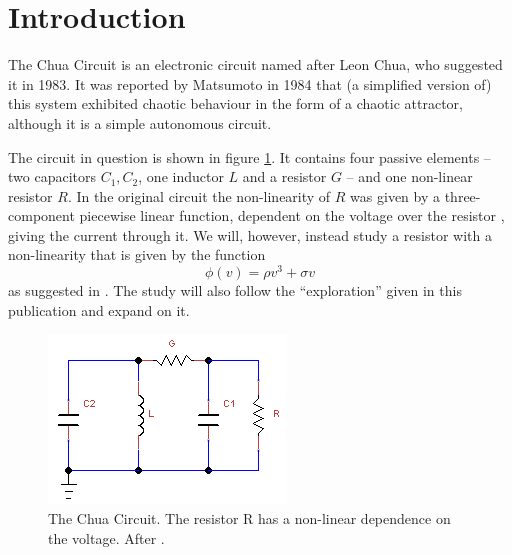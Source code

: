 \section{Introduction}

The Chua Circuit is an electronic circuit named after Leon Chua, who
suggested it in 1983.  It was reported by Matsumoto in 1984
\cite{Matsumoto84} that (a simplified version of) this system
exhibited chaotic behaviour in the form of a chaotic attractor,
although it is a simple autonomous circuit.

The circuit in question is shown in figure \ref{fig:circuit}.  It
contains four passive elements -- two capacitors $C_1, C_2$, one
inductor $L$ and a resistor $G$ -- and one non-linear resistor $R$.
In the original circuit the non-linearity of $R$ was given by a
three-component piecewise linear function, dependent on the voltage
over the resistor \cite{Matsumoto84,Matsumoto85,Chua86}, giving the
current through it.  We will, however, instead study a resistor with a
non-linearity that is given by the function
\begin{equation}
  \label{eq:non-linearity}
  \phi(v) = \rho v^3 + \sigma v
\end{equation}
as suggested in \cite[p. 379]{hirsch12}.  The study will also follow
the ``exploration'' given in this publication and expand on it.

\begin{figure}[h]
  \centering
  \includegraphics{chuacircuit.png}
  \caption{The Chua Circuit.  The resistor R has a non-linear dependence on the voltage.  After \cite{Matsumoto84,Matsumoto85}.}
  \label{fig:circuit}
\end{figure}

